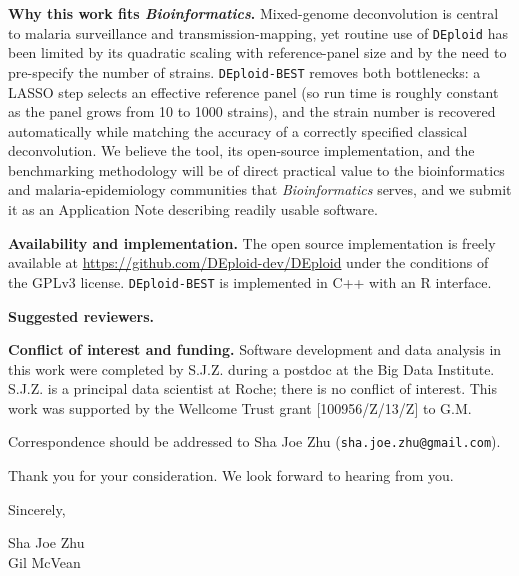 \documentclass[11pt]{article}
\begin{document}
\medskip

\noindent\textbf{Why this work fits \emph{Bioinformatics}.}
Mixed-genome deconvolution is central to malaria surveillance and
transmission-mapping, yet routine use of \texttt{DEploid} has been limited by its
quadratic scaling with reference-panel size and by the need to pre-specify the
number of strains. \texttt{DEploid-BEST} removes both bottlenecks: a LASSO step
selects an effective reference panel (so run time is roughly constant as the
panel grows from 10 to 1000 strains), and the strain number is recovered
automatically while matching the accuracy of a correctly specified classical
deconvolution. We believe the tool, its open-source implementation, and the
benchmarking methodology will be of direct practical value to the
bioinformatics and malaria-epidemiology communities that \emph{Bioinformatics}
serves, and we submit it as an Application Note describing readily usable
software.

\medskip

\noindent\textbf{Availability and implementation.}
The open source implementation is freely available at
\url{https://github.com/DEploid-dev/DEploid} under the conditions of the GPLv3
license. \texttt{DEploid-BEST} is implemented in C++ with an R interface.

\medskip

\noindent\textbf{Suggested reviewers.}

\medskip

\noindent\textbf{Conflict of interest and funding.}
Software development and data analysis in this work were completed by S.J.Z.
during a postdoc at the Big Data Institute. S.J.Z. is a principal data scientist
at Roche; there is no conflict of interest. This work was supported by the
Wellcome Trust grant [100956/Z/13/Z] to G.M.

\medskip

Correspondence should be addressed to Sha Joe Zhu
(\texttt{sha.joe.zhu@gmail.com}).

\medskip

Thank you for your consideration. We look forward to hearing from you.

\medskip

\noindent Sincerely,

\medskip

\noindent Sha Joe Zhu\\
Gil McVean
\end{document}
